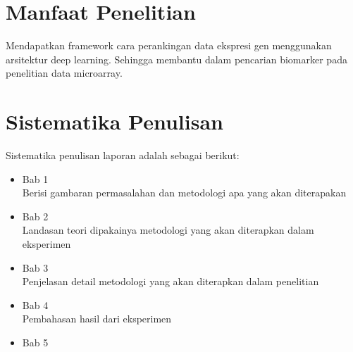 \section{Manfaat Penelitian}
Mendapatkan framework cara perankingan data ekspresi gen menggunakan arsitektur deep learning. Sehingga membantu dalam pencarian biomarker pada penelitian data microarray.

\section{Sistematika Penulisan}
Sistematika penulisan laporan adalah sebagai berikut:
\begin{itemize}
	\item Bab 1 \babSatu \\
	Berisi gambaran permasalahan dan metodologi apa yang akan diterapakan
	\item Bab 2 \babDua \\
	Landasan teori dipakainya metodologi yang akan diterapkan dalam eksperimen
	\item Bab 3 \babTiga \\
	Penjelasan detail metodologi yang akan diterapkan dalam penelitian
	\item Bab 4 \babEmpat \\
	Pembahasan hasil dari eksperimen
	\item Bab 5 \kesimpulan \\
\end{itemize}


